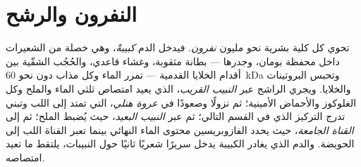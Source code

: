 \section{النفرون والرشح}

\begin{definition}[النفرون]\label{def:b3:renal-osmoregulation:nephron}
تحوي كل كلية بشرية نحو مليون \emph{نفرون}. فيدخل الدم
\emph{كبيبةً}، وهي خصلة من الشعيرات داخل محفظة بومان، وجدرها
--- بطانة مثقوبة، وغشاء قاعدي، والحُجُب الشقّية بين أقدام
الخلايا القدمية --- تمرر الماء وكل مذاب دون نحو \qty{60}{kDa}
وتحبس البروتينات والخلايا. ويجري الراشح عبر \emph{النبيب
القريب}، الذي يعيد امتصاص ثلثي الماء والملح وكل الغلوكوز
والأحماض الأمينية؛ ثم نزولًا وصعودًا في \emph{عروة هنلي}،
التي تمتد إلى اللب وتبني تدرج التركيز الذي في القسم التالي؛
ثم عبر \emph{النبيب البعيد}، حيث يُضبط الملح؛ ثم إلى
\emph{القناة الجامعة}، حيث يحدد الفازوبريسين محتوى الماء
النهائي بينما تعبر القناة اللب إلى الحويضة. والدم الذي يغادر
الكبيبة يدخل سريرًا شعريًا ثانيًا حول النبيبات، يلتقط ما
تعيد امتصاصه.
\end{definition}

